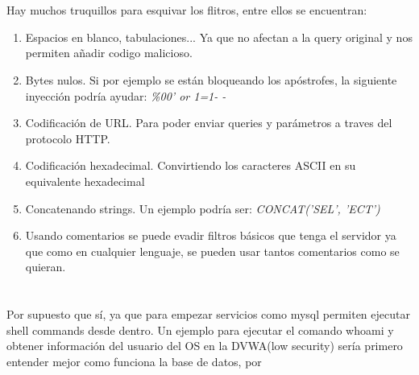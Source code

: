\documentclass[12pt,a4paper,oneside,onecolumn]{article}
\begin{document}
	\section{}
	Hay muchos truquillos para esquivar los flitros, entre ellos se encuentran:
	\begin{enumerate}
	\item 
	Espacios en blanco, tabulaciones... Ya que no afectan a la query original y nos permiten a\~nadir codigo malicioso.
	\item
	Bytes nulos. Si por ejemplo se est\'an bloqueando los ap\'ostrofes, la siguiente inyecci\'on podr\'ia ayudar: \emph{\%00' or 1=1- -}
	\item
	Codificaci\'on de URL. Para poder enviar queries y par\'ametros a traves del protocolo HTTP.
	\item
	Codificaci\'on hexadecimal. Convirtiendo los caracteres ASCII en su equivalente hexadecimal
	\item
	Concatenando strings. Un ejemplo podr\'ia ser: \emph{CONCAT('SEL', 'ECT')}
	\item 
	Usando comentarios se puede evadir filtros b\'asicos que tenga el servidor ya que como en cualquier lenguaje, se pueden usar tantos comentarios como se quieran.
	\end{enumerate}
	
	\section{}
	Por supuesto que s\'i, ya que para empezar servicios como mysql permiten ejecutar shell commands desde dentro. Un ejemplo para ejecutar el comando whoami y obtener informaci\'on del usuario del OS en la DVWA(low security) ser\'ia primero entender mejor como funciona la base de datos, por
	
\end{document}
